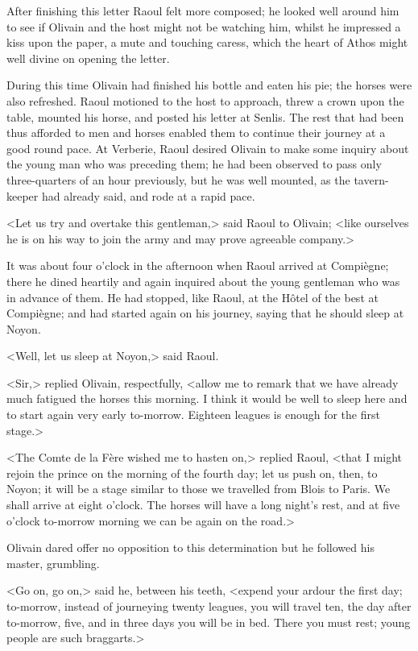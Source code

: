 After finishing this letter Raoul felt more composed; he looked well around him to see if Olivain and the host might not be watching him, whilst he impressed a kiss upon the paper, a mute and touching caress, which the heart of Athos might well divine on opening the letter.

During this time Olivain had finished his bottle and eaten his pie; the horses were also refreshed. Raoul motioned to the host to approach, threw a crown upon the table, mounted his horse, and posted his letter at Senlis. The rest that had been thus afforded to men and horses enabled them to continue their journey at a good round pace. At Verberie, Raoul desired Olivain to make some inquiry about the young man who was preceding them; he had been observed to pass only three-quarters of an hour previously, but he was well mounted, as the tavern-keeper had already said, and rode at a rapid pace.

<Let us try and overtake this gentleman,> said Raoul to Olivain; <like ourselves he is on his way to join the army and may prove agreeable company.>

It was about four o'clock in the afternoon when Raoul arrived at Compiègne; there he dined heartily and again inquired about the young gentleman who was in advance of them. He had stopped, like Raoul, at the Hôtel of  the best at Compiègne; and had started again on his journey, saying that he should sleep at Noyon.

<Well, let us sleep at Noyon,> said Raoul.

<Sir,> replied Olivain, respectfully, <allow me to remark that we have already much fatigued the horses this morning. I think it would be well to sleep here and to start again very early to-morrow. Eighteen leagues is enough for the first stage.>

<The Comte de la Fère wished me to hasten on,> replied Raoul, <that I might rejoin the prince on the morning of the fourth day; let us push on, then, to Noyon; it will be a stage similar to those we travelled from Blois to Paris. We shall arrive at eight o'clock. The horses will have a long night's rest, and at five o'clock to-morrow morning we can be again on the road.>

Olivain dared offer no opposition to this determination but he followed his master, grumbling.

<Go on, go on,> said he, between his teeth, <expend your ardour the first day; to-morrow, instead of journeying twenty leagues, you will travel ten, the day after to-morrow, five, and in three days you will be in bed. There you must rest; young people are such braggarts.>

